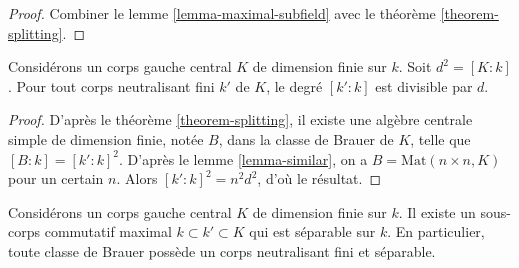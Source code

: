 \begin{proof}
Combiner le lemme \ref{lemma-maximal-subfield} avec le
théorème \ref{theorem-splitting}.
\end{proof}

\begin{lemma}
\label{lemma-splitting-field-degree}
Considérons un corps gauche central $K$ de dimension finie sur $k$. Soit $d^2 = [K : k]$.
Pour tout corps neutralisant fini $k'$ de $K$, le degré $[k' : k]$ est
divisible par $d$.
\end{lemma}

\begin{proof}
D'après le théorème \ref{theorem-splitting}, il existe une algèbre centrale
simple de dimension finie, notée $B$, dans la classe de Brauer de $K$, telle que
$[B : k] = [k' : k]^2$. D'après le
lemme \ref{lemma-similar},
on a $B = \text{Mat}(n \times n, K)$ pour un certain $n$.
Alors $[k' : k]^2 = n^2d^2$, d'où le résultat.
\end{proof}

\begin{proposition}
\label{proposition-separable-splitting-field}
Considérons un corps gauche central $K$ de dimension finie sur $k$.
Il existe un sous-corps commutatif maximal $k \subset k' \subset K$ qui
est séparable sur $k$.
En particulier, toute classe de Brauer possède un corps neutralisant
fini et séparable.
\end{proposition}

